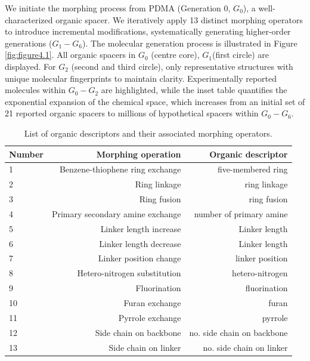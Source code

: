 We initiate the morphing process from PDMA (Generation 0, $G_0$), a well-characterized organic spacer\cite{RN34}. We iteratively apply 13 distinct morphing operators to introduce incremental modifications, systematically generating higher-order generations ($G_1-G_6$). The molecular generation process is illustrated in Figure \ref{fig:figure4.1}. All organic spacers in $G_0$ (centre core), $G_1$(first circle) are displayed. For $G_2$ (second and third circle), only representative structures with unique molecular fingerprints to maintain clarity. Experimentally reported molecules within $G_0-G_2$ are highlighted, while the inset table quantifies the exponential expansion of the chemical space, which increases from an initial set of 21 reported organic spacers to millions of hypothetical spacers within $G_0-G_6$.

\begin{table}[!ht]
    \centering
    \caption{List of organic descriptors and their associated morphing operators.}\label{t:morphing1}
    \begin{tabular}{|l|r|r|}
        \hline
        \textbf{Number} & \textbf{Morphing operation} & \textbf{Organic descriptor} \\  \hline
        1 & Benzene-thiophene ring exchange & five-membered ring \\ \hline
        2 & Ring linkage & ring linkage \\ \hline 
        3 & Ring fusion & ring fusion \\ \hline
        4 & Primary secondary amine exchange & number of primary amine \\ \hline 
        5 & Linker length increase & Linker length \\ \hline 
        6 & Linker length decrease & Linker length \\ \hline
        7 & Linker position change & linker position \\  \hline
        8 & Hetero-nitrogen substitution & hetero-nitrogen \\  \hline 
        9 & Fluorination & fluorination \\  \hline
        10 & Furan exchange & furan \\ \hline 
        11 & Pyrrole exchange & pyrrole \\ \hline 
        12 & Side chain on backbone & no. side chain on backbone \\ \hline  
        13 & Side chain on linker & no. side chain on linker \\ \hline
    \end{tabular}
\end{table}

